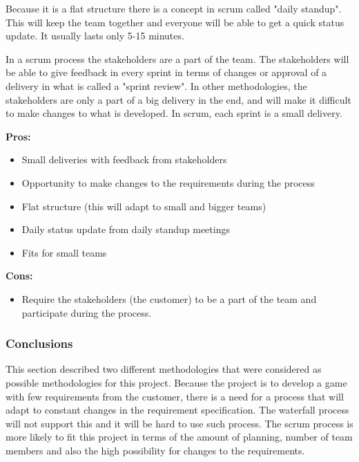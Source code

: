 Because it is a flat structure there is a concept in scrum called "daily standup". This will keep the team together and everyone will be able to get a quick status update. It usually lasts only 5-15 minutes. 

In a scrum process the stakeholders are a part of the team. The stakeholders will be able to give
feedback in every sprint in terms of changes or approval of a delivery in what is called a "sprint review".
In other methodologies, the stakeholders are only a part of a big delivery in the end, and will 
make it difficult to make changes to what is developed. In scrum, each sprint is a small delivery.

{\bf Pros: }
\begin{itemize}
	\item Small deliveries with feedback from stakeholders
	\item Opportunity to make changes to the requirements during the process
	\item Flat structure (this will adapt to small and bigger teams)
	\item Daily status update from daily standup meetings
	\item Fits for small teams
\end{itemize}

{\bf Cons: }
\begin{itemize}
	\item Require the stakeholders (the customer) to be a part of the team and participate during the process.
\end{itemize}

\subsubsection{Conclusions}
This section described two different methodologies that were considered as possible methodologies for this project. Because the project is to develop a game with few requirements from the customer, there is a need for a process that will adapt to constant changes in the requirement specification. The waterfall process will not support this and it will be hard to use such process. The scrum process is more likely to fit this project in terms of the amount of planning, 
number of team members and also the high possibility for changes to the requirements.




